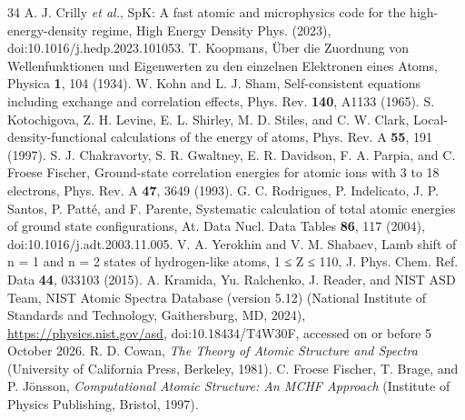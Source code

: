 \documentclass[aps,pra,preprint,superscriptaddress,amsmath,amssymb]{revtex4-2}
\begin{document}
\begin{thebibliography}{34}
 A. J. Crilly \emph{et al.}, SpK: A fast atomic and microphysics code for the high-energy-density regime, High Energy Density Phys. (2023), doi:10.1016/j.hedp.2023.101053.
 T. Koopmans, Über die Zuordnung von Wellenfunktionen und Eigenwerten zu den einzelnen Elektronen eines Atoms, Physica \textbf{1}, 104 (1934).
 W. Kohn and L. J. Sham, Self-consistent equations including exchange and correlation effects, Phys. Rev. \textbf{140}, A1133 (1965).
 S. Kotochigova, Z. H. Levine, E. L. Shirley, M. D. Stiles, and C. W. Clark, Local-density-functional calculations of the energy of atoms, Phys. Rev. A \textbf{55}, 191 (1997).
 S. J. Chakravorty, S. R. Gwaltney, E. R. Davidson, F. A. Parpia, and C. Froese Fischer, Ground-state correlation energies for atomic ions with 3 to 18 electrons, Phys. Rev. A \textbf{47}, 3649 (1993).
 G. C. Rodrigues, P. Indelicato, J. P. Santos, P. Patté, and F. Parente, Systematic calculation of total atomic energies of ground state configurations, At. Data Nucl. Data Tables \textbf{86}, 117 (2004), doi:10.1016/j.adt.2003.11.005.
 V. A. Yerokhin and V. M. Shabaev, Lamb shift of n = 1 and n = 2 states of hydrogen-like atoms, 1 ≤ Z ≤ 110, J. Phys. Chem. Ref. Data \textbf{44}, 033103 (2015).
 A. Kramida, Yu. Ralchenko, J. Reader, and NIST ASD Team, NIST Atomic Spectra Database (version 5.12) (National Institute of Standards and Technology, Gaithersburg, MD, 2024), \url{https://physics.nist.gov/asd}, doi:10.18434/T4W30F, accessed on or before 5 October 2026.
 R. D. Cowan, \emph{The Theory of Atomic Structure and Spectra} (University of California Press, Berkeley, 1981).
 C. Froese Fischer, T. Brage, and P. Jönsson, \emph{Computational Atomic Structure: An MCHF Approach} (Institute of Physics Publishing, Bristol, 1997).
\end{thebibliography}
\end{document}
